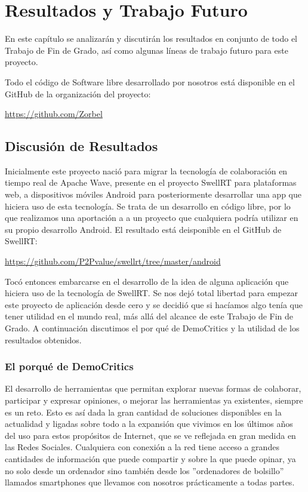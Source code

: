 \newpage
\thispagestyle{sectioned}
\chapter{Resultados y Trabajo Futuro}

En este capítulo se analizarán y discutirán los resultados en conjunto de todo el Trabajo de Fin de Grado, así como algunas líneas de trabajo futuro para este proyecto.

Todo el código de Software libre desarrollado por nosotros está disponible en el GitHub de la organización del proyecto:

\url{https://github.com/Zorbel}

\section{Discusión de Resultados}

Inicialmente este proyecto nació para migrar la tecnología de colaboración en tiempo real de Apache Wave, presente en el proyecto SwellRT para plataformas web, a dispositivos móviles Android para posteriormente desarrollar una app que hiciera uso de esta tecnología. Se trata de un desarrollo en código libre, por lo que realizamos una aportación a a un proyecto que cualquiera podría utilizar en su propio desarrollo Android. El resultado está deisponible en el GitHub de SwellRT:

\url{https://github.com/P2Pvalue/swellrt/tree/master/android}

Tocó entonces embarcarse en el desarrollo de la idea de alguna aplicación que hiciera uso de la tecnología de SwellRT. Se nos dejó total libertad para empezar este proyecto de aplicación desde cero y se decidió que si hacíamos algo tenía que tener utilidad en el mundo real, más allá del alcance de este Trabajo de Fin de Grado. A continuación discutimos el por qué de DemoCritics y la utilidad de los resultados obtenidos. 


\subsection{El porqué de DemoCritics}

El desarrollo de herramientas que permitan explorar nuevas formas de colaborar, participar y expresar opiniones, o mejorar las herramientas ya existentes, siempre es un reto. Esto es así dada la gran cantidad de soluciones disponibles en la actualidad y ligadas sobre todo a la expansión que vivimos en los últimos años del uso para estos propósitos de Internet, que se ve reflejada en gran medida en las Redes Sociales. Cualquiera con conexión a la red tiene acceso a grandes cantidades de información que puede compartir y sobre la que puede opinar, ya no solo desde un ordenador sino también desde los ''ordenadores de bolsillo'' llamados smartphones que llevamos con nosotros prácticamente a todas partes.

